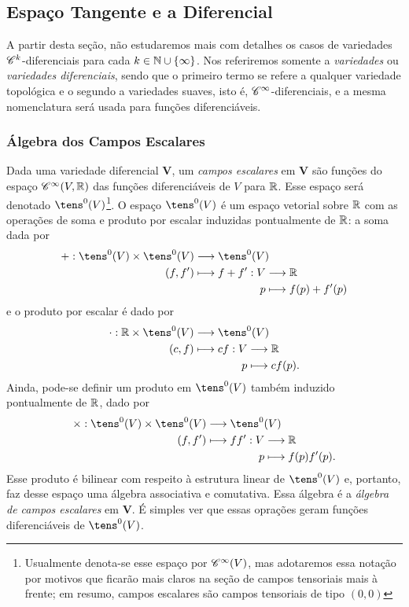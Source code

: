 \subsection{Espaço Tangente e a Diferencial}

A partir desta seção, não estudaremos mais com detalhes os casos de variedades $\mathscr{C}^k$-diferenciais para cada $k \in \mathbb{N} \cup \{\infty\}$. Nos referiremos somente a \emph{variedades} ou \emph{variedades diferenciais}, sendo que o primeiro termo se refere a qualquer variedade topológica e o segundo a variedades suaves, isto é, $\mathscr{C}^\infty$-diferenciais, e a mesma nomenclatura será usada para funções diferenciáveis.

\subsubsection{Álgebra dos Campos Escalares}

Dada uma variedade diferencial $\bm V$, um \emph{campos escalares} em $\bm V$ são funções do espaço $\mathscr{C}^\infty(V,\mathbb{R})$ das funções diferenciáveis de $V$ para $\mathbb{R}$. Esse espaço será denotado $\tens^0(V)$\footnote{Usualmente denota-se esse espaço por $\mathscr{C}^\infty(V)$, mas adotaremos essa notação por motivos que ficarão mais claros na seção de campos tensoriais mais à frente; em resumo, campos escalares são campos tensoriais de tipo $(0,0)$}. O espaço $\tens^0(V)$ é um espaço vetorial sobre $\mathbb{R}$ com as operações de soma e produto por escalar induzidas pontualmente de $\mathbb{R}$: a soma dada por
	\begin{align*}
	\func{+}{\tens^0(V) \times \tens^0(V)}{\tens^0(V)}{(f,f')}{
		\begin{aligned}[t]
		\func{f+f'}{V}{\R}{p}{f(p)+f'(p)}
		\end{aligned}
		}
	\end{align*}
e o produto por escalar é dado por
	\begin{align*}
	\func{\cdot}{\R \times \tens^0(V)}{\tens^0(V)}{(c,f)}{
		\begin{aligned}[t]
		\func{cf}{V}{\R}{p}{cf(p).}
		\end{aligned}
		}
	\end{align*}
Ainda, pode-se definir um produto em $\tens^0(V)$ também induzido pontualmente de $\mathbb{R}$, dado por
	\begin{align*}
	\func{\times}{\tens^0(V) \times \tens^0(V)}{\tens^0(V)}{(f,f')}{
		\begin{aligned}[t]
		\func{ff'}{V}{\R}{p}{f(p)f'(p).}
		\end{aligned}
		}
	\end{align*}
Esse produto é bilinear com respeito à estrutura linear de $\tens^0(V)$ e, portanto, faz desse espaço uma álgebra associativa e comutativa. Essa álgebra é a \emph{álgebra de campos escalares} em $\bm V$. É simples ver que essas oprações geram funções diferenciáveis de $\tens^0(V)$.


